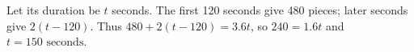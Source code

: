 Let its duration be $t$ seconds. The first 120 seconds give 480 pieces; later seconds give $2(t-120)$. Thus $480+2(t-120)=3.6t$, so $240=1.6t$ and $\boxed{t=150\text{ seconds}}$.
